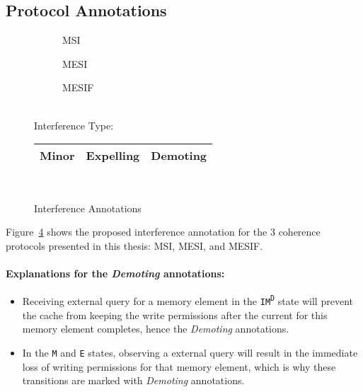 \subsection{Protocol Annotations}
\begin{figure}[hbt!]
\begin{center}
\begin{subfigure}{0.325\linewidth}
\resizebox{\linewidth}{!}{}
\caption{MSI}
\label{fig:msi-interference}
\end{subfigure}
\begin{subfigure}{0.325\linewidth}
\resizebox{\linewidth}{!}{}
\caption{MESI}
\label{fig:mesi-interference}
\end{subfigure}
\begin{subfigure}{0.325\linewidth}
\resizebox{\linewidth}{!}{}
\caption{MESIF}
\label{fig:mesif-interference}
\end{subfigure}
\\
\vspace{1em}
Interference Type:
\begin{tabular}{|lll|}
\hline
\cellcolor{olive!80}Minor &
\cellcolor{orange!60}Expelling &
\cellcolor{blue!40}Demoting\\
\hline
\end{tabular}\\
\end{center}
\caption{Interference Annotations}
\label{fig:interference_annotations}
\end{figure}

Figure~\ref{fig:interference_annotations} shows the proposed interference
annotation for the 3 coherence protocols presented in this thesis: MSI, MESI,
and MESIF.

\paragraph{Explanations for the \textit{Demoting} annotations:}
\begin{itemize}
\item
   Receiving \getsquery{} external query for a memory element in the
   \texttt{IM\textsuperscript{D}} state will prevent the cache from keeping the
   write permissions after the current \storeinstr{} for this memory element
   completes, hence the \textit{Demoting} annotations.
\item
   In the \texttt{M} and \texttt{E} states, observing a \getsquery{} external
   query will result in the immediate loss of writing permissions for that
   memory element, which is why these transitions are marked with
   \textit{Demoting} annotations.
\end{itemize}


